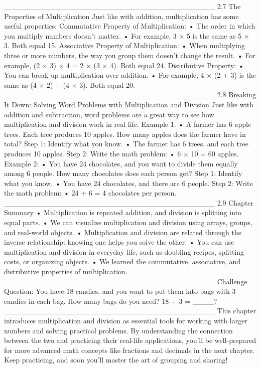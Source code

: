 ________________________________________
2.7 The Properties of Multiplication
Just like with addition, multiplication has some useful properties:
Commutative Property of Multiplication:
•	The order in which you multiply numbers doesn’t matter.
•	For example, 3 × 5 is the same as 5 × 3. Both equal 15.
Associative Property of Multiplication:
•	When multiplying three or more numbers, the way you group them doesn’t change the result.
•	For example, (2 × 3) × 4 = 2 × (3 × 4). Both equal 24.
Distributive Property:
•	You can break up multiplication over addition.
•	For example, 4 × (2 + 3) is the same as (4 × 2) + (4 × 3). Both equal 20.
________________________________________
2.8 Breaking It Down: Solving Word Problems with Multiplication and Division
Just like with addition and subtraction, word problems are a great way to see how multiplication and division work in real life.
Example 1:
•	A farmer has 6 apple trees. Each tree produces 10 apples. How many apples does the farmer have in total?
Step 1: Identify what you know.
•	The farmer has 6 trees, and each tree produces 10 apples.
Step 2: Write the math problem:
•	6 × 10 = 60 apples.
Example 2:
•	You have 24 chocolates, and you want to divide them equally among 6 people. How many chocolates does each person get?
Step 1: Identify what you know.
•	You have 24 chocolates, and there are 6 people.
Step 2: Write the math problem:
•	24 ÷ 6 = 4 chocolates per person.
________________________________________
2.9 Chapter Summary
•	Multiplication is repeated addition, and division is splitting into equal parts.
•	We can visualize multiplication and division using arrays, groups, and real-world objects.
•	Multiplication and division are related through the inverse relationship: knowing one helps you solve the other.
•	You can use multiplication and division in everyday life, such as doubling recipes, splitting costs, or organizing objects.
•	We learned the commutative, associative, and distributive properties of multiplication.
________________________________________
Challenge Question:
You have 18 candies, and you want to put them into bags with 3 candies in each bag. How many bags do you need?
18 ÷ 3 = ____?
________________________________________
This chapter introduces multiplication and division as essential tools for working with larger numbers and solving practical problems. By understanding the connection between the two and practicing their real-life applications, you’ll be well-prepared for more advanced math concepts like fractions and decimals in the next chapter. Keep practicing, and soon you'll master the art of grouping and sharing!
